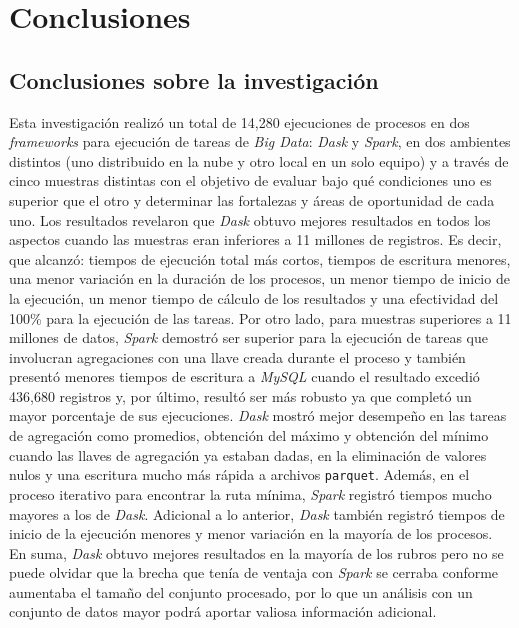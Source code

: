 \chapter*{Conclusiones}


\section{Conclusiones sobre la investigación}

Esta investigación realizó un total de 14,280 ejecuciones de procesos en dos \textit{frameworks} para ejecución de tareas de \textit{Big Data}: \textit{Dask} y \textit{Spark}, en dos ambientes distintos (uno distribuido en la nube y otro local en un solo equipo) y a través de cinco muestras distintas con el objetivo de evaluar bajo qué condiciones uno es superior que el otro y determinar las fortalezas y áreas de oportunidad de cada uno. Los resultados revelaron que \textit{Dask} obtuvo mejores resultados en todos los aspectos cuando las muestras eran inferiores a 11 millones de registros. Es decir, que alcanzó: tiempos de ejecución total más cortos, tiempos de escritura menores, una menor variación en la duración de los procesos, un menor tiempo de inicio de la ejecución, un menor tiempo de cálculo de los resultados y una efectividad del 100\% para la ejecución de las tareas. Por otro lado, para muestras superiores a 11 millones de datos, \textit{Spark} demostró ser superior para la ejecución de tareas que involucran agregaciones con una llave creada durante el proceso y también presentó menores tiempos de escritura a \textit{MySQL} cuando el resultado excedió 436,680 registros y, por último, resultó ser más robusto ya que completó un mayor porcentaje de sus ejecuciones. \textit{Dask} mostró mejor desempeño en las tareas de agregación como promedios, obtención del máximo y obtención del mínimo cuando las llaves de agregación ya estaban dadas, en la eliminación de valores nulos y una escritura mucho más rápida a archivos \texttt{parquet}. Además, en el proceso iterativo para encontrar la ruta mínima, \textit{Spark} registró tiempos mucho mayores a los de \textit{Dask}. Adicional a lo anterior, \textit{Dask} también registró tiempos de inicio de la ejecución menores y menor variación en la mayoría de los procesos.  En suma, \textit{Dask} obtuvo mejores resultados en la mayoría de los rubros pero no se puede olvidar que la brecha que tenía de ventaja con \textit{Spark} se cerraba conforme aumentaba el tamaño del conjunto procesado, por lo que un análisis con un conjunto de datos mayor podrá aportar valiosa información adicional.

